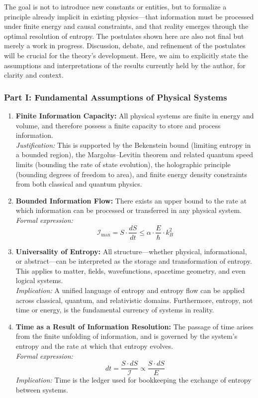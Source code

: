 \documentclass[12pt]{article}
\begin{document}
The goal is not to introduce new constants or entities, but to formalize a principle already implicit in existing physics—that information must be processed under finite energy and causal constraints, and that reality emerges through the optimal resolution of entropy. The postulates shown here are also not final but merely a work in progress. Discussion, debate, and refinement of the postulates will be crucial for the theory's development. Here, we aim to explicitly state the assumptions and interpretations of the results currently held by the author, for clarity and context.

\subsubsection{Part I: Fundamental Assumptions of Physical Systems}

\begin{enumerate}
    \item \textbf{Finite Information Capacity:}  
    All physical systems are finite in energy and volume, and therefore possess a finite capacity to store and process information.\\
    \textit{Justification:} This is supported by the Bekenstein bound (limiting entropy in a bounded region), the Margolus–Levitin theorem and related quantum speed limits (bounding the rate of state evolution), the holographic principle (bounding degrees of freedom to area), and finite energy density constraints from both classical and quantum physics.

    \item \textbf{Bounded Information Flow:}  
    There exists an upper bound to the rate at which information can be processed or transferred in any physical system.\\
    \textit{Formal expression:}
    \[
    \mathcal{I}_{\text{max}} = S \cdot \frac{dS}{dt} \leq \alpha \cdot \frac{E}{\hbar} \cdot k_B^2
    \]


    \item \textbf{Universality of Entropy:}  
    All structure—whether physical, informational, or abstract—can be interpreted as the storage and transformation of entropy. This applies to matter, fields, wavefunctions, spacetime geometry, and even logical systems.\\
    \textit{Implication:} A unified language of entropy and entropy flow can be applied across classical, quantum, and relativistic domains. Furthermore, entropy, not time or energy, is the fundamental currency of systems in reality.

    \item \textbf{Time as a Result of Information Resolution:}  
    The passage of time arises from the finite unfolding of information, and is governed by the system’s entropy and the rate at which that entropy evolves.\\
    \textit{Formal expression:}
    \[
    dt = \frac{S \cdot dS}{\mathcal{I}} \propto \frac{S \cdot dS}{E}
    \]
    \textit{Implication:} Time is the ledger used for bookkeeping the exchange of entropy between systems.

\end{enumerate}
\end{document}
